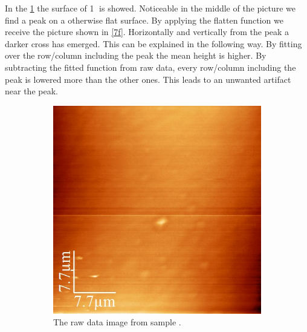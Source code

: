 \documentclass[paper=a4,fontsize=10pt,DIV=18,twocolumn,parskip=half]{scrartcl}
\numberwithin{equation}{section}    %
\begin{document}
In the \ref{7} the surface of \textcircled{1} is showed. Noticeable in the 
middle of the picture we find a peak on a otherwise flat surface. By applying 
the flatten function we receive the picture shown in \ref{7f}. Horizontally and 
vertically from the peak a darker cross has emerged. This can be explained in 
the following way. By fitting over the row/column including the peak the mean 
height is higher. By subtracting the fitted function from raw data, every 
row/column including the peak is lowered more than the other ones. This leads to 
an unwanted artifact near the peak.
\begin{figure}
    \centering
    \begin{subfigure}[t]{0.45\columnwidth}
        \includegraphics[width=\columnwidth]{Bilder/1}
        \caption{The raw data image from sample . }
        \label{7}
    \end{subfigure}
    ~
    \begin{subfigure}[t]{0.45\columnwidth}

\end{subfigure}
\end{figure}
\end{document}
